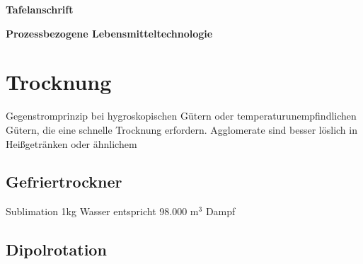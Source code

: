 \documentclass[a4paper,11pt]{article}
\newif\ifshowme
\begin{document}
\ifshowme
\newgeometry{top=1.8cm,bottom=3cm,left=2cm,right=4cm}
\else
{}
\fi

\bckgrnd


\begin{center}
\LARGE
\color{white}
\textbf{Tafelanschrift} \par \vspace*{2mm}
\large \color{miugray} \textbf{Prozessbezogene Lebensmitteltechnologie}
\end{center}
\par 
\vspace*{6mm}


\color{miudiutex}
\section*{Trocknung}
Gegenstromprinzip bei hygroskopischen Gütern oder temperaturunempfindlichen Gütern, die eine schnelle Trocknung erfordern.
\pp
Agglomerate sind besser löslich in Heißgetränken oder ähnlichem 
\subsection*{Gefriertrockner}
Sublimation 1kg Wasser entspricht 98.000 m$^3$ Dampf

\subsection*{Dipolrotation}
\end{document}
